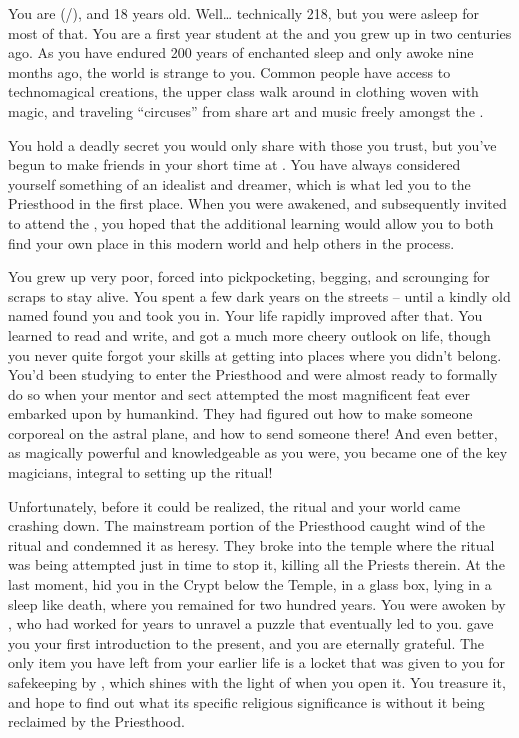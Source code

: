 \documentclass[char]{GL2020}
\begin{document}
\name{\cDisney{}}


You are \cDisney{} (\cDisney{\they}/\cDisney{\them}), and 18 years old. Well… technically 218, but you were asleep for most of that. You are a first year student at the \pSchool{} and you grew up in \pFarm{} two centuries ago. As you have endured 200 years of enchanted sleep and only awoke nine months ago, the world is strange to you. Common people have access to technomagical creations, the upper class walk around in clothing woven with magic, and traveling “circuses” from \pTech{} share art and music freely amongst the \pFarmers{}.

You hold a deadly secret you would only share with those you trust, but you’ve begun to make friends in your short time at \pSchool{}. You have always considered yourself something of an idealist and dreamer, which is what led you to the Priesthood in the first place. When you were awakened, and subsequently invited to attend the \pSc{}, you hoped that the additional learning would allow you to both find your own place in this modern world and help others in the process.

You grew up very poor, forced into pickpocketing, begging, and scrounging for scraps to stay alive. You spent a few dark years on the streets -- until a kindly old \cDisneyMentor{\cleric} named \cDisneyMentor{} found you and took you in. Your life rapidly improved after that. You learned to read and write, and got a much more cheery outlook on life, though you never quite forgot your skills at getting into places where you didn’t belong. You’d been studying to enter the Priesthood and were almost ready to formally do so when your mentor \cDisneyMentor{} and \cDisneyMentor{\their} sect attempted the most magnificent feat ever embarked upon by humankind. They had figured out how to make someone corporeal on the astral plane, and how to send someone there! And even better, as magically powerful and knowledgeable as you were, you became one of the key magicians, integral to setting up the ritual! 

Unfortunately, before it could be realized, the ritual and your world came crashing down. The mainstream portion of the Priesthood caught wind of the ritual and condemned it as heresy. They broke into the temple where the ritual was being attempted just in time to stop it, killing all the Priests therein. At the last moment, \cDisneyMentor{} hid you in the Crypt below the Temple, in a glass box, lying in a sleep like death, where you remained for two hundred years. You were awoken by \cWildCard{}, who had worked for years to unravel a puzzle that eventually led \cWildCard{\them} to you. \cWildCard{} gave you your first introduction to the present, and you are eternally grateful. The only item you have left from your earlier life is a locket that was given to you for safekeeping by \cDisneyMentor{}, which shines with the light of \cFarmGod{} when you open it. You treasure it, and hope to find out what its specific religious significance is without it being reclaimed by the Priesthood.
\end{document}
